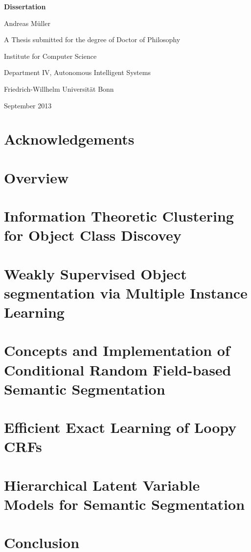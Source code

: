 \documentclass[12pt,toc=bibnumbered, a4paper,twoside]{scrbook}
\begin{document}
\begin{titlepage}
\begin{center}
\vspace*{1in}
\textbf{{\LARGE Dissertation}}
\par
\vspace{1.5in} {\large Andreas M\"uller}
 \par \vfill A Thesis submitted for the degree of Doctor of Philosophy
\par \vspace{0.5in}
Institute for Computer Science \par
Department IV, Autonomous Intelligent Systems
\par \vspace{0.5in}
Friedrich-Willhelm Universit\"at Bonn \par
\vspace{0.5in} September 2013 \end{center}

\end{titlepage}


\tableofcontents

\chapter*{Acknowledgements}


\chapter{Overview}


\chapter{Information Theoretic Clustering for Object Class Discovey}


\chapter{Weakly Supervised Object segmentation via Multiple Instance Learning}



\chapter{Concepts and Implementation of Conditional Random Field-based Semantic Segmentation}\label{structured_pystruct}



\chapter{Efficient Exact Learning of Loopy CRFs}



\chapter{Hierarchical Latent Variable Models for Semantic Segmentation}

\chapter{Conclusion}




\end{document}
